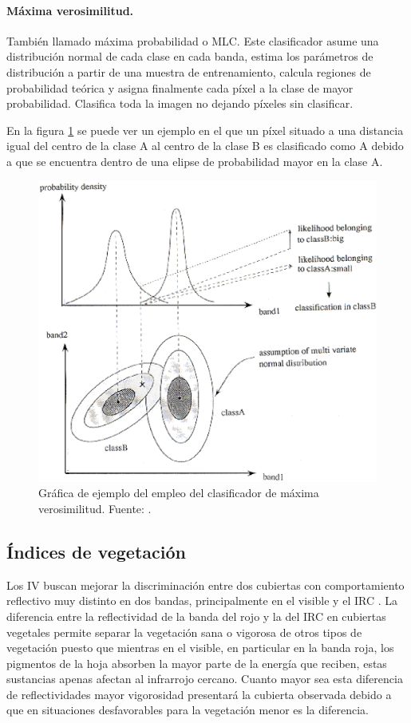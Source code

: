 \paragraph{Máxima verosimilitud.}
También llamado máxima probabilidad o \ac{MLC}. Este clasificador asume una distribución normal de cada clase en cada banda, estima los parámetros de distribución a partir de una muestra de entrenamiento, calcula regiones de probabilidad teórica y asigna finalmente cada píxel a la clase de mayor probabilidad. Clasifica toda la imagen no dejando píxeles sin clasificar.%

En la figura \ref{fig:MLC} se puede ver un ejemplo en el que un píxel situado a una distancia igual del centro de la clase A al centro de la clase B es clasificado como A debido a que se encuentra dentro de una elipse de probabilidad mayor en la clase A.

\begin{figure}
	\centering
	\includegraphics[width=0.6\linewidth]{./Imagenes/MLK.eps}
	\caption[Clasificador de máxima verosimilitud]{Gráfica de ejemplo del empleo del clasificador de máxima verosimilitud. Fuente: \cite{JARS1999}.}
	\label{fig:MLC}
\end{figure}

\subsection{Índices de vegetación} \label{subsec:indices_vegetacion}
Los \ac{IV} buscan mejorar la discriminación entre dos cubiertas con comportamiento reflectivo muy distinto en dos bandas, principalmente en el visible y el \ac{IRC} \citep{chuvieco2002teledeteccion}. La diferencia entre la reflectividad de la banda del rojo y la del \ac{IRC} en cubiertas vegetales permite separar la vegetación sana o vigorosa de otros tipos de vegetación puesto que mientras en el visible, en particular en la banda roja, los pigmentos de la hoja absorben la mayor parte de la energía que reciben, estas sustancias apenas afectan al infrarrojo cercano. Cuanto mayor sea esta diferencia de reflectividades mayor vigorosidad presentará la cubierta observada debido a que en situaciones desfavorables para la vegetación menor es la diferencia.%

